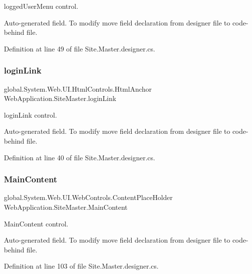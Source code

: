 logged\+User\+Menu control. 

Auto-\/generated field. To modify move field declaration from designer file to code-\/behind file. 

Definition at line 49 of file Site.\+Master.\+designer.\+cs.

\mbox{\label{classWebApplication_1_1SiteMaster_a2a39715c1c4cf02add7dcc3edb7575ef}} 
\subsubsection{\texorpdfstring{loginLink}{loginLink}}
{\footnotesize\ttfamily global.\+System.\+Web.\+U\+I.\+Html\+Controls.\+Html\+Anchor Web\+Application.\+Site\+Master.\+login\+Link\hspace{0.3cm}{\ttfamily [protected]}}



login\+Link control. 

Auto-\/generated field. To modify move field declaration from designer file to code-\/behind file. 

Definition at line 40 of file Site.\+Master.\+designer.\+cs.

\mbox{\label{classWebApplication_1_1SiteMaster_a8fdc1b5ff8c354ce9d5776cf0c5087a2}} 
\subsubsection{\texorpdfstring{MainContent}{MainContent}}
{\footnotesize\ttfamily global.\+System.\+Web.\+U\+I.\+Web\+Controls.\+Content\+Place\+Holder Web\+Application.\+Site\+Master.\+Main\+Content\hspace{0.3cm}{\ttfamily [protected]}}



Main\+Content control. 

Auto-\/generated field. To modify move field declaration from designer file to code-\/behind file. 

Definition at line 103 of file Site.\+Master.\+designer.\+cs.

